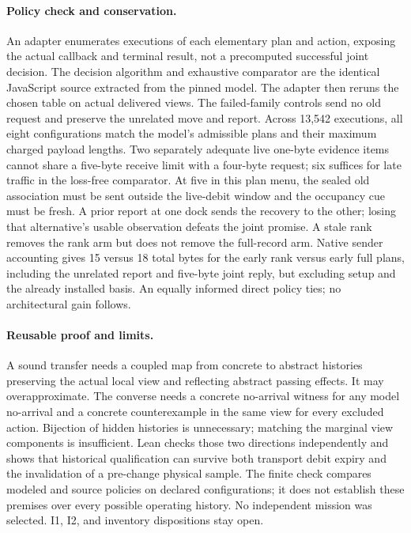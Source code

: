\documentclass{article}
\begin{document}
\paragraph{Policy check and conservation.}
An adapter enumerates executions of each elementary plan and
action, exposing the actual callback and terminal result, not a
precomputed successful joint decision. The decision algorithm and
exhaustive comparator are the identical JavaScript source extracted
from the pinned model. The adapter then reruns the chosen table on
actual delivered views. The failed-family controls send no old request
and preserve the unrelated move and report.
Across 13,542 executions, all eight configurations match the model's
admissible plans and their maximum charged payload lengths. Two
separately adequate live one-byte evidence items cannot share a
five-byte receive limit with a four-byte request; six suffices for
late traffic in the loss-free comparator. At five in this plan menu, the sealed old
association must be sent outside the live-debit window and the
occupancy cue must be fresh. A prior report at one dock sends the
recovery to the other; losing that alternative's usable observation
defeats the joint promise. A stale rank removes the rank arm but
does not remove the full-record arm. Native sender accounting gives
15 versus 18 total bytes for the early rank versus early full plans,
including the unrelated report and five-byte joint reply, but
excluding setup and the already installed basis. An equally
informed direct policy ties; no architectural gain follows.

\paragraph{Reusable proof and limits.}
A sound transfer needs a coupled map from concrete to abstract
histories preserving the actual local view and reflecting abstract
passing effects. It may overapproximate. The converse needs a
concrete no-arrival witness for any model no-arrival and a concrete
counterexample in the same view for every excluded action.
Bijection of hidden histories is unnecessary; matching
the marginal view components is insufficient. Lean checks those
two directions independently and shows that historical qualification
can survive both transport debit expiry and the invalidation of a
pre-change physical sample. The finite check compares modeled
and source policies on declared configurations; it does not establish
these premises over every possible operating history. No independent
mission was selected. I1, I2, and inventory dispositions stay open.
\end{document}
